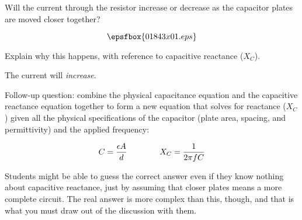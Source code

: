 

Will the current through the resistor increase or decrease as the capacitor plates are moved closer together?

$$\epsfbox{01843x01.eps}$$

Explain why this happens, with reference to capacitive reactance ($X_C$).







The current will {\it increase}.

\vskip 10pt

Follow-up question: combine the physical capacitance equation and the capacitive reactance equation together to form a new equation that solves for reactance ($X_C$) given all the physical specifications of the capacitor (plate area, spacing, and permittivity) and the applied frequency:

$$C = {\epsilon A \over d} \hbox{\hskip 40pt} X_C = {1 \over {2 \pi f C}}$$







Students might be able to guess the correct answer even if they know nothing about capacitive reactance, just by assuming that closer plates means a more complete circuit.  The real answer is more complex than this, though, and that is what you must draw out of the discussion with them.




